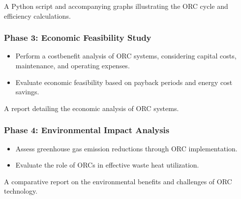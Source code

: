 \documentclass[letterpaper,10pt,english]{jupyterBook}
\begin{document}
\sphinxAtStartPar
{} A Python script and accompanying graphs illustrating
the ORC cycle and efficiency calculations.


\subsubsection{Phase 3: Economic Feasibility Study}
\label{\detokenize{ProjectInstructions:phase-3-economic-feasibility-study}}
\sphinxAtStartPar
{}
\begin{itemize}
\item {} 
\sphinxAtStartPar
Perform a cost\sphinxhyphen{}benefit analysis of ORC systems, considering capital
costs, maintenance, and operating expenses.

\item {} 
\sphinxAtStartPar
Evaluate economic feasibility based on payback periods and energy
cost savings.

\end{itemize}

\sphinxAtStartPar
{} A report detailing the economic analysis of ORC
systems.


\subsubsection{Phase 4: Environmental Impact Analysis}
\label{\detokenize{ProjectInstructions:phase-4-environmental-impact-analysis}}
\sphinxAtStartPar
{}
\begin{itemize}
\item {} 
\sphinxAtStartPar
Assess greenhouse gas emission reductions through ORC
implementation.

\item {} 
\sphinxAtStartPar
Evaluate the role of ORCs in effective waste heat utilization.

\end{itemize}

\sphinxAtStartPar
{} A comparative report on the environmental benefits and
challenges of ORC technology.
\end{document}
